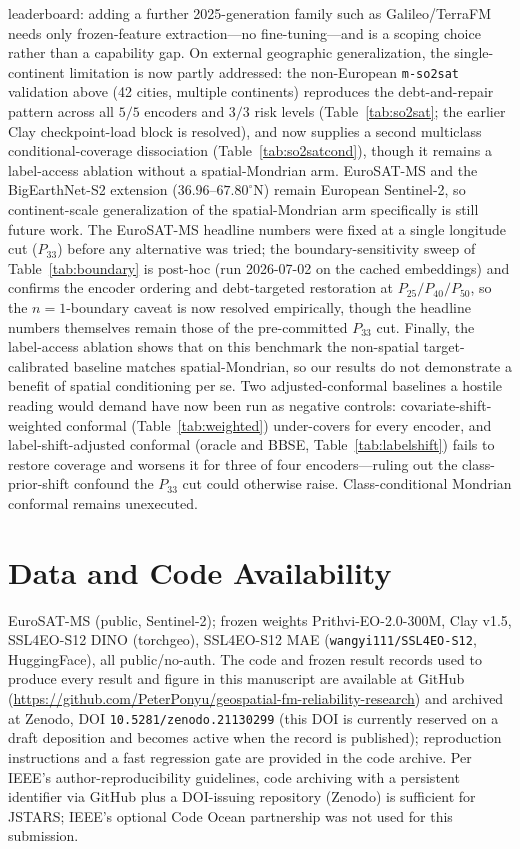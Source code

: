 \documentclass[journal]{IEEEtran}
\renewcommand{\_}{\textunderscore\allowbreak}
\begin{document}
leaderboard: adding a further 2025-generation family such as Galileo/TerraFM needs only frozen-feature
extraction---no fine-tuning---and is a scoping choice rather than a capability gap. On external geographic generalization, the single-continent limitation is now partly
addressed: the non-European \texttt{m-so2sat} validation above (42 cities, multiple continents) reproduces
the debt-and-repair pattern across all $5/5$ encoders and $3/3$ risk levels (Table~\ref{tab:so2sat}; the
earlier Clay checkpoint-load block is resolved), and now supplies a second multiclass conditional-coverage
dissociation (Table~\ref{tab:so2satcond}), though it remains a
label-access ablation without a spatial-Mondrian arm. EuroSAT-MS and the BigEarthNet-S2 extension ($36.96$--$67.80^\circ$N) remain European Sentinel-2,
so continent-scale generalization of the spatial-Mondrian arm specifically is still future work. The EuroSAT-MS headline
numbers were fixed at a single longitude cut ($P_{33}$) before any alternative was tried; the
boundary-sensitivity sweep of Table~\ref{tab:boundary} is post-hoc (run 2026-07-02 on the cached
embeddings) and confirms the encoder ordering and debt-targeted restoration at $P_{25}/P_{40}/P_{50}$, so
the $n{=}1$-boundary caveat is now resolved empirically, though the headline numbers themselves remain
those of the pre-committed $P_{33}$ cut. Finally, the label-access ablation shows that on this benchmark
the non-spatial target-calibrated baseline matches spatial-Mondrian, so our results do not
demonstrate a benefit of spatial conditioning per se. Two adjusted-conformal baselines a hostile
reading would demand have now been run as negative controls: covariate-shift-weighted conformal
(Table~\ref{tab:weighted}) under-covers for every encoder, and label-shift-adjusted conformal
(oracle and BBSE, Table~\ref{tab:labelshift}) fails to restore coverage and worsens it for three of
four encoders---ruling out the class-prior-shift confound the $P_{33}$ cut could otherwise raise.
Class-conditional Mondrian conformal remains unexecuted.

\section*{Data and Code Availability}
EuroSAT-MS (public, Sentinel-2); frozen weights Prithvi-EO-2.0-300M, Clay v1.5, SSL4EO-S12 DINO (torchgeo),
SSL4EO-S12 MAE (\texttt{wangyi111/SSL4EO-S12}, HuggingFace), all public/no-auth. The code and frozen
result records used to produce every result and figure in this manuscript are available at GitHub
(\url{https://github.com/PeterPonyu/geospatial-fm-reliability-research}) and archived at Zenodo, DOI
\texttt{10.5281/zenodo.21130299} (this DOI is currently reserved on a draft deposition and becomes
active when the record is published); reproduction instructions and a fast regression gate are provided
in the code archive. Per IEEE's author-reproducibility guidelines, code archiving with a persistent
identifier via GitHub plus a DOI-issuing repository (Zenodo) is sufficient for JSTARS; IEEE's optional
Code Ocean partnership was not used for this submission.



\end{document}
